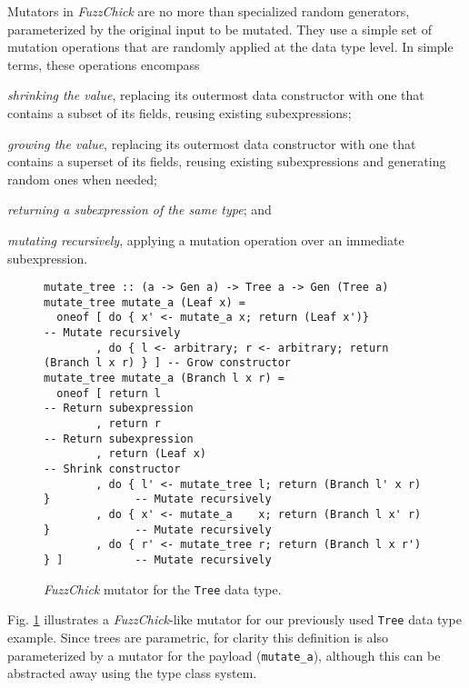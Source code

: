 \documentclass[acmsmall, anonymous]{acmart}
\newcommand{\fuzzchick}{\textit{FuzzChick}\xspace}
\begin{document}
Mutators in \fuzzchick are no more than specialized random generators,
parameterized by the original input to be mutated.
%
They use a simple set of mutation operations that are randomly applied at the
data type level.
%
In simple terms, these operations encompass
%
\begin{inparaenum}
\item \emph{shrinking the value}, replacing its outermost data constructor with
  one that contains a subset of its fields, reusing existing subexpressions;
\item \emph{growing the value}, replacing its outermost data constructor with
  one that contains a superset of its fields, reusing existing subexpressions
  and generating random ones when needed;
\item \emph{returning a subexpression of the same type}; and
\item \emph{mutating recursively}, applying a mutation operation over an
  immediate subexpression.
\end{inparaenum}


\begin{figure}
\begin{verbatim}
mutate_tree :: (a -> Gen a) -> Tree a -> Gen (Tree a)
mutate_tree mutate_a (Leaf x) =
  oneof [ do { x' <- mutate_a x; return (Leaf x')}                       -- Mutate recursively
        , do { l <- arbitrary; r <- arbitrary; return (Branch l x r) } ] -- Grow constructor
mutate_tree mutate_a (Branch l x r) =
  oneof [ return l                                                       -- Return subexpression
        , return r                                                       -- Return subexpression
        , return (Leaf x)                                                -- Shrink constructor
        , do { l' <- mutate_tree l; return (Branch l' x r) }             -- Mutate recursively
        , do { x' <- mutate_a    x; return (Branch l x' r) }             -- Mutate recursively
        , do { r' <- mutate_tree r; return (Branch l x r') } ]           -- Mutate recursively
\end{verbatim}
\vspace{-5pt}
\caption{\label{fig:fuzzchick:mutator}\fuzzchick mutator for the \texttt{Tree} data type. }
\vspace{-15pt}
\end{figure}

Fig. \ref{fig:fuzzchick:mutator} illustrates a \fuzzchick-like mutator for our
previously used \texttt{Tree} data type example.
%
Since trees are parametric, for clarity this definition is also parameterized by
a mutator for the payload (\texttt{mutate\_a}), although this can be abstracted
away using the type class system.
\end{document}
